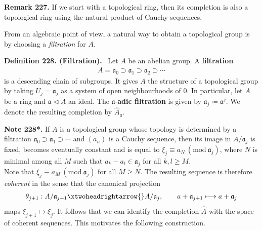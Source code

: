 \documentclass[12pt,a4paper,footinclude=true,headinclude=true]{scrbook} %
\newenvironment{definition}[2][Definition]
    { \begin{mdframed}[backgroundcolor=gray!20] \textbf{#1 #2.}\ }
    {  \end{mdframed}}
\newenvironment{remark}[2][Remark]
    { \begin{mdframed}[backgroundcolor=gray!20] \textbf{#1 #2.} }
    {  \end{mdframed}}
\newenvironment{nt}[2][Note]
    { \begin{mdframed}[backgroundcolor=gray!20] \textbf{#1 #2.} }
    {  \end{mdframed}}
\begin{document}
\begin{remark}{227}
    If we start with a topological ring, then its completion is also a topological ring using the natural product of Cauchy sequences.
\end{remark}

From an algebraic point of view, a natural way to obtain a topological group is by choosing a \textit{filtration} for $A$.
\begin{definition}{228. (Filtration)}
    \newline Let $A$ be an abelian group. A \textbf{filtration}
    \begin{align*}
        A=\mathfrak{a}_0\supset\mathfrak{a}_1\supset\mathfrak{a}_2\supset\cdots
    \end{align*}
    is a descending chain of subgroups. It gives $A$ the structure of a topological group by taking $U_j=\mathfrak{a}_j$ as a system of open neighbourhoods of $0$. In particular, let $A$ be a ring and $\mathfrak{a}\triangleleft A$ an ideal. The $\mathfrak{a}$-\textbf{adic filtration} is given by $\mathfrak{a}_j\coloneqq\mathfrak{a}^j$. We denote the resulting completion by $\widehat{A}_\mathfrak{a}$.
\end{definition}
\newpage
\begin{nt}{228*}
    If $A$ is a topological group whose topology is determined by a filtration $\mathfrak{a}_0\supset\mathfrak{a}_1\supset\cdots$ and $(a_n)$ is a Cauchy sequence, then its image in $A/\mathfrak{a}_j$ is fixed, becomes eventually constant and is equal to $\xi_j\equiv a_N\ (\mathrm{mod}\ \mathfrak{a}_j)$, where $N$ is minimal among all $M$ such that $a_k-a_l\in\mathfrak{a}_j$ for all $k,l\geq M$.\\
    Note that $\xi_j\equiv a_M\ (\mathrm{mod}\ \mathfrak{a}_j)$ for all $M\geq N$. The resulting sequence is therefore \textit{coherent} in the sense that the canonical projection
    \begin{align*}
        \theta_{j+1}:A/\mathfrak{a}_{j+1}\xtwoheadrightarrow{} A/\mathfrak{a}_j,\qquad a+\mathfrak{a}_{j+1}\longmapsto a+\mathfrak{a}_j
    \end{align*}
    maps $\xi_{j+1}\mapsto\xi_j$. It follows that we can identify the completion $\widehat{A}$ with the space of coherent sequences. This motivates the following construction.
\end{nt}
\end{document}
